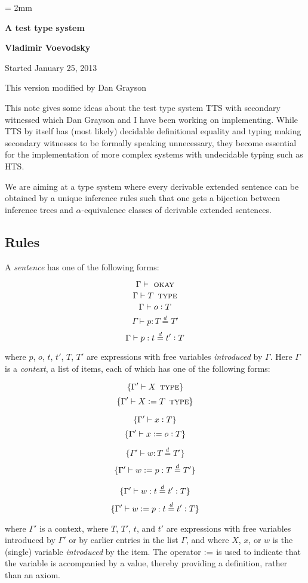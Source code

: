 \documentclass[11pt]{article}
\newcommand{\eqd}{\stackrel{d}{=}}
\newcommand{\ccolon}[1]{\vcentcolon#1}
\newcommand{\Type}{\mathop{\text{ \sc type}}}
\newcommand{\Okay}{\mathop{\text{ \sc okay}}}
\newcommand{\defn}{\vcentcolon=}
\begin{document}
\parskip = 2mm
\begin{center}
{\bf\Large A test type system}

{\bf Vladimir Voevodsky}

{Started January 25, 2013}  

{This version modified by Dan Grayson}  
\end{center}

\tableofcontents

This note gives some ideas about the test type system TTS with secondary
witnessed which Dan Grayson and I have been working on implementing. While TTS
by itself has (most likely) decidable definitional equality and typing making
secondary witnesses to be formally speaking unnecessary, they become essential
for the implementation of more complex systems with undecidable typing such as
HTS.

We are aiming at a type system where every derivable extended sentence can be
obtained by a unique inference rules such that one gets a bijection between
inference trees and $\alpha$-equivalence classes of derivable extended
sentences.

\subsection{Rules}

A {\em sentence} has one of the following forms:

$$\Gamma\vdash \Okay$$
$$\Gamma\vdash T \Type$$
$$\Gamma\vdash o \ccolon{T}$$
$$\Gamma\vdash p : T \eqd T'$$
$$\Gamma\vdash p : t \eqd t' \ccolon{T}$$

where $p$, $o$, $t$, $t'$, $T$, $T'$ are expressions with free variables {\em
  introduced} by $\Gamma$.  Here $\Gamma$ is a {\em context}, a list of items,
each of which has one of the following forms:

$$\{ \Gamma'\vdash X \Type \}$$
$$\{ \Gamma'\vdash X \defn T \Type \}$$

$$\{ \Gamma'\vdash x \ccolon{T} \}$$
$$\{ \Gamma'\vdash x \defn o \ccolon{T} \}$$

$$\{ \Gamma'\vdash w : T \eqd T'\}$$
$$\{ \Gamma'\vdash w \defn p : T \eqd T'\}$$

$$\{ \Gamma'\vdash w : t \eqd t' \ccolon{T} \}$$
$$\{ \Gamma'\vdash w \defn p : t \eqd t' \ccolon{T} \}$$

where $\Gamma'$ is a context, where $T$, $T'$, $t$, and $t'$ are expressions
with free variables introduced by $\Gamma'$ or by earlier entries in the list
$\Gamma$, and where $X$, $x$, or $w$ is the (single) variable {\em introduced}
by the item.  The operator $\defn$ is used to indicate that the variable is
accompanied by a value, thereby providing a definition, rather than an axiom.
\end{document}
